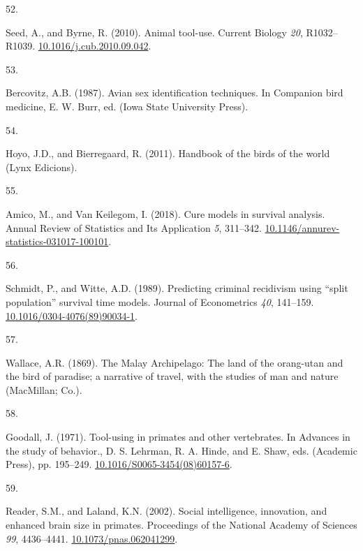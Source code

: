 \documentclass[
  man, donotrepeattitle,floatsintext]{apa6}
\newlength{\cslhangindent}
\newlength{\csllabelwidth}
\newlength{\cslentryspacingunit} %
\newenvironment{CSLReferences}[2] %
 {%
  \setlength{\parindent}{0pt}
  \ifodd #1
  \let\oldpar\par
  \def\par{\hangindent=\cslhangindent\oldpar}
  \fi
  \setlength{\parskip}{#2\cslentryspacingunit}
 }%
 {}
\newcommand{\CSLLeftMargin}[1]{\parbox[t]{\csllabelwidth}{#1}}
\newcommand{\CSLRightInline}[1]{\parbox[t]{\linewidth - \csllabelwidth}{#1}\break}
\begin{document}
\begin{CSLReferences}{0}{0}
\leavevmode{}%
\CSLLeftMargin{52. }%
\CSLRightInline{Seed, A., and Byrne, R. (2010). Animal tool-use. Current Biology \emph{20}, R1032--R1039. \href{https://doi.org/10.1016/j.cub.2010.09.042}{10.1016/j.cub.2010.09.042}.}

\leavevmode{}%
\CSLLeftMargin{53. }%
\CSLRightInline{Bercovitz, A.B. (1987). Avian sex identification techniques. In Companion bird medicine, E. W. Burr, ed. (Iowa State University Press).}

\leavevmode{}%
\CSLLeftMargin{54. }%
\CSLRightInline{Hoyo, J.D., and Bierregaard, R. (2011). Handbook of the birds of the world (Lynx Edicions).}

\leavevmode{}%
\CSLLeftMargin{55. }%
\CSLRightInline{Amico, M., and Van Keilegom, I. (2018). Cure models in survival analysis. Annual Review of Statistics and Its Application \emph{5}, 311--342. \href{https://doi.org/10.1146/annurev-statistics-031017-100101}{10.1146/annurev-statistics-031017-100101}.}

\leavevmode{}%
\CSLLeftMargin{56. }%
\CSLRightInline{Schmidt, P., and Witte, A.D. (1989). Predicting criminal recidivism using {``split population''} survival time models. Journal of Econometrics \emph{40}, 141--159. \href{https://doi.org/10.1016/0304-4076(89)90034-1}{10.1016/0304-4076(89)90034-1}.}

\leavevmode{}%
\CSLLeftMargin{57. }%
\CSLRightInline{Wallace, A.R. (1869). The {M}alay {A}rchipelago: The land of the orang-utan and the bird of paradise; a narrative of travel, with the studies of man and nature (MacMillan; Co.).}

\leavevmode{}%
\CSLLeftMargin{58. }%
\CSLRightInline{Goodall, J. (1971). Tool-using in primates and other vertebrates. In Advances in the study of behavior., D. S. Lehrman, R. A. Hinde, and E. Shaw, eds. (Academic Press), pp. 195--249. \href{https://doi.org/10.1016/S0065-3454(08)60157-6}{10.1016/S0065-3454(08)60157-6}.}

\leavevmode{}%
\CSLLeftMargin{59. }%
\CSLRightInline{Reader, S.M., and Laland, K.N. (2002). Social intelligence, innovation, and enhanced brain size in primates. Proceedings of the National Academy of Sciences \emph{99}, 4436--4441. \href{https://doi.org/10.1073/pnas.062041299}{10.1073/pnas.062041299}.}


\end{CSLReferences}
\end{document}
